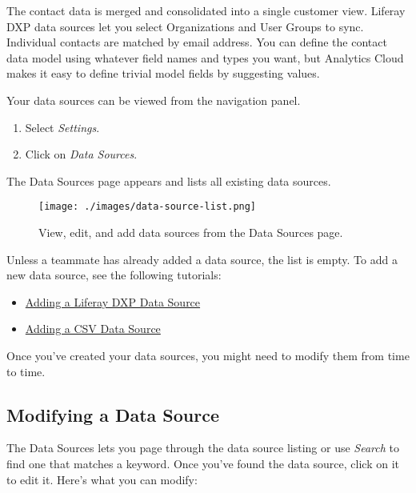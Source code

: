 The contact data is merged and consolidated into a single customer view.
Liferay DXP data sources let you select Organizations and User Groups to
sync. Individual contacts are matched by email address. You can define
the contact data model using whatever field names and types you want,
but Analytics Cloud makes it easy to define trivial model fields by
suggesting values.

Your data sources can be viewed from the navigation panel.

\begin{enumerate}
\def\labelenumi{\arabic{enumi}.}
\item
  Select \emph{Settings}.
\item
  Click on \emph{Data Sources}.
\end{enumerate}

The Data Sources page appears and lists all existing data sources.

\begin{figure}
\centering
\texttt{[image: ./images/data-source-list.png]}
\caption{View, edit, and add data sources from the Data Sources page.}
\end{figure}

Unless a teammate has already added a data source, the list is empty. To
add a new data source, see the following tutorials:

\begin{itemize}
\tightlist
\item
  \href{https://github.com/liferay/liferay-docs/blob/7.1.x/discover/analytics-cloud/articles/02-getting-started/02-adding-a-liferay-dxp-data-source.markdown}{Adding
  a Liferay DXP Data Source}
\item
  \href{https://github.com/liferay/liferay-docs/blob/7.1.x/discover/analytics-cloud/articles/02-getting-started/03-adding-a-csv-data-source.markdown}{Adding
  a CSV Data Source}
\end{itemize}

Once you've created your data sources, you might need to modify them
from time to time.

\subsection{Modifying a Data Source}\label{modifying-a-data-source}

The Data Sources lets you page through the data source listing or use
\emph{Search} to find one that matches a keyword. Once you've found the
data source, click on it to edit it. Here's what you can modify:

